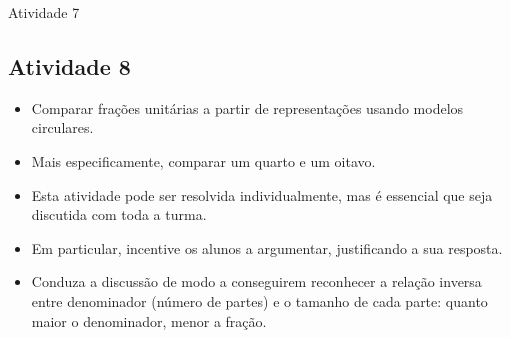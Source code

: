 \begin{multicols}{2}
\begin{resposta*}{Atividade 7}
\end{resposta*}

\subsection{Atividade 8}

  \vspace{.1cm}

\begin{itemize} %
    \item       Comparar frações unitárias a partir de representações usando modelos circulares.
    \item       Mais especificamente, comparar um quarto e um oitavo.
\end{itemize} %


  \vspace{.1cm}

  \vspace{.1cm}

\begin{itemize} %
    \item       Esta atividade pode ser resolvida individualmente, mas é essencial que seja discutida com toda a turma.
    \item       Em particular, incentive os alunos a argumentar, justificando a sua resposta.
    \item       Conduza a discussão de modo a conseguirem reconhecer a relação inversa entre denominador (número de partes) e o tamanho de cada parte: quanto maior o denominador, menor a fração.
\end{itemize} %


  \vspace{.1cm}





\end{multicols}
